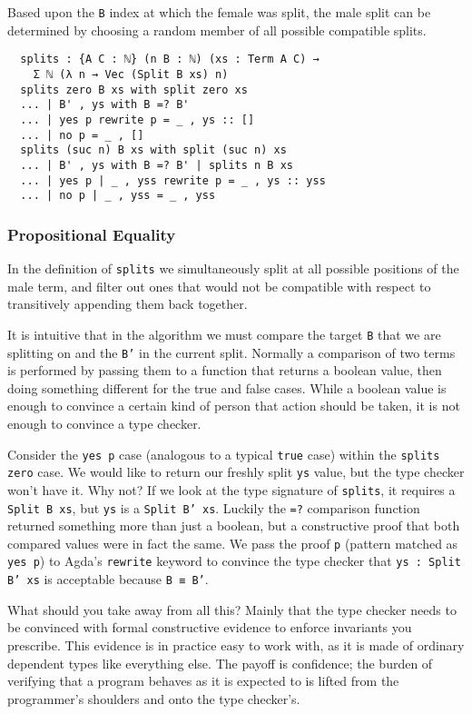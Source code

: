 \documentclass{acm_proc_article-sp}
\begin{document}
Based upon the \texttt{B} index at which the female was split, the
male split can be determined by choosing a random member of all
possible compatible splits.

\begin{verbatim}
  splits : {A C : ℕ} (n B : ℕ) (xs : Term A C) →
    Σ ℕ (λ n → Vec (Split B xs) n)
  splits zero B xs with split zero xs
  ... | B' , ys with B =? B'
  ... | yes p rewrite p = _ , ys :: []
  ... | no p = _ , []
  splits (suc n) B xs with split (suc n) xs
  ... | B' , ys with B =? B' | splits n B xs
  ... | yes p | _ , yss rewrite p = _ , ys :: yss
  ... | no p | _ , yss = _ , yss
\end{verbatim}

\subsubsection{Propositional Equality}

In the definition of \texttt{splits} we simultaneously split at all
possible positions of the male term, and filter out ones that would
not be compatible with respect to transitively appending them back
together.

It is intuitive that in the algorithm we must compare the target \texttt{B}
that we are splitting on and the \texttt{B'} in the current
split. Normally a comparison of two terms is performed by passing them
to a function that returns a boolean value, then doing something
different for the true and false cases. While a boolean value is
enough to convince a certain kind of person that action should be
taken, it is not enough to convince a type checker.

Consider the \texttt{yes p} case (analogous to a typical \texttt{true}
case) within the \texttt{splits zero} case. We would like to return
our freshly split \texttt{ys} value, but the type checker won't have
it. Why not? If we look at the type signature of \texttt{splits}, it
requires a \texttt{Split B xs}, but \texttt{ys} is a \texttt{Split B'
  xs}. Luckily the \texttt{=?} comparison function returned something
more than just a boolean, but a constructive proof that both compared
values were in fact the same. We pass the proof \texttt{p} (pattern
matched as \texttt{yes p}) to Agda's \texttt{rewrite} keyword to
convince the type checker that \texttt{ys : Split B' xs} is acceptable
because \texttt{B ≡ B'}.

What should you take away from all this? Mainly that the type checker
needs to be convinced with formal constructive evidence to enforce
invariants you prescribe. This evidence is in practice easy to work
with, as it is made of ordinary dependent types like everything
else. The payoff is confidence; the burden of verifying that
a program behaves as it is expected to is lifted from the programmer's
shoulders and onto the type checker's.
\end{document}

